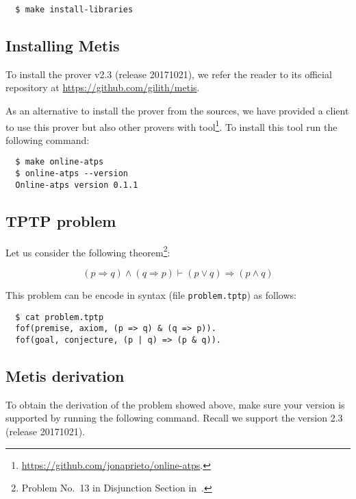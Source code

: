 \documentclass[../main.tex]{subfiles}
\begin{document}
\begin{subappendices}
\begin{verbatim}
  $ make install-libraries
\end{verbatim}

\subsection{Installing Metis}

To install the \Metis prover v2.3 (release 20171021),
we refer the reader to its official
repository at \url{https://github.com/gilith/metis}.

As an alternative to install the prover from the \Metis sources,
we have provided a \Haskell client
to use this prover but also other provers with 
tool\footnote{\url{https://github.com/jonaprieto/online-atps}.}.
To install this tool run the following command:

\begin{verbatim}
  $ make online-atps
  $ online-atps --version
  Online-atps version 0.1.1
\end{verbatim}

\subsection{TPTP problem}

Let us consider the following
theorem\footnote{Problem No.~13 in Disjunction Section in~\cite{Prieto-Cubides2017}.}:

\begin{equation}
\label{eq:complete-example-problem}
(p \Rightarrow q) \wedge (q \Rightarrow p) ⊢ (p \vee q) \Rightarrow (p \wedge q)
\end{equation}

This problem can be encode in \TPTP syntax (file \verb!problem.tptp!) as follows:

\begin{verbatim}
  $ cat problem.tptp
  fof(premise, axiom, (p => q) & (q => p)).
  fof(goal, conjecture, (p | q) => (p & q)).
\end{verbatim}

\subsection{Metis derivation}

To obtain the \Metis derivation of the \TPTP problem showed above,
make sure your \Metis version is supported by running the following
command. Recall we support the version 2.3 (release 20171021).


\end{subappendices}
\end{document}

